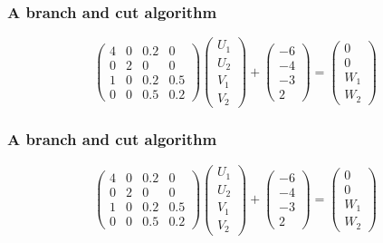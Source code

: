 \frame
{
\frametitle{A branch and cut algorithm}
\[\left(\begin{array}{cccc}
4&0&0.2&0\\
0&2&0&0\\
1&0&0.2&0.5\\
0&0&0.5&0.2
 \end{array}\right) \left(\begin{array}{c}
 U_1\\
 U_2\\
 V_1\\
 V_2
 \end{array}\right) + \left(\begin{array}{c}
 -6\\
 -4\\
 -3\\
 2
 \end{array}\right) =  \left(\begin{array}{c}
 0\\
 0\\
 W_1\\
 W_2
 \end{array}\right) 
 \]
\begin{figure}[h]
\centerline{
 \scalebox{0.5}{
    
 }
}
\end{figure}

}
\frame
{
\frametitle{A branch and cut algorithm}
\[\left(\begin{array}{cccc}
4&0&0.2&0\\
0&2&0&0\\
1&0&0.2&0.5\\
0&0&0.5&0.2
 \end{array}\right) \left(\begin{array}{c}
 U_1\\
 U_2\\
 V_1\\
 V_2
 \end{array}\right) + \left(\begin{array}{c}
 -6\\
 -4\\
 -3\\
 2
 \end{array}\right) =  \left(\begin{array}{c}
 0\\
 0\\
 W_1\\
 W_2
 \end{array}\right) 
 \]
\begin{figure}[h]
\centerline{
 \scalebox{0.5}{
    
 }
}
\end{figure}

}
